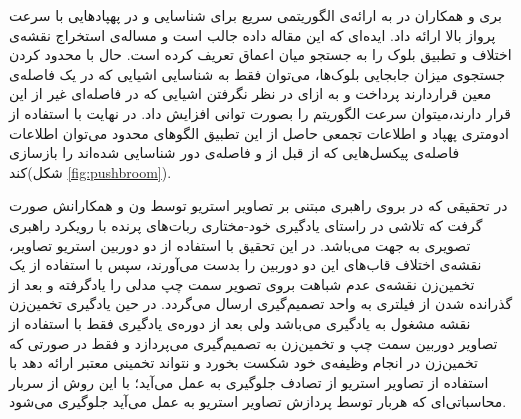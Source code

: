 بری و همکاران در  به ارائه‌ی الگوریتمی سریع برای شناسایی و  در پهپادهایی با سرعت پرواز بالا ارائه داد. ایده‌ای که این مقاله داده جالب است و مساله‌ی استخراج نقشه‌ی اختلاف و تطبیق بلوک را به جستجو میان اعماق تعریف کرده است. حال با محدود کردن جستجوی میزان جابجایی بلوک‌ها، می‌توان فقط به شناسایی اشیایی که در یک فاصله‌ی معین قراردارند پرداخت و به ازای در نظر نگرفتن اشیایی که در فاصله‌ای غیر از این قرار دارند،میتوان سرعت الگوریتم را بصورت توانی افزایش داد. در نهایت با استفاده از ادومتری پهپاد و اطلاعات تجمعی حاصل از این تطبیق الگوهای محدود می‌توان اطلاعات فاصله‌ی پیکسل‌هایی که از قبل از و فاصله‌ی دور شناسایی شده‌اند را بازسازی کند(شکل \ref{fig:pushbroom}).


در تحقیقی که در  بروی راهبری مبتنی بر تصاویر استریو توسط ون و همکارانش صورت گرفت که تلاشی در راستای یادگیری خود-مختاری ربات‌های پرنده با رویکرد راهبری تصویری به جهت  می‌باشد. در این تحقیق با استفاده از دو دوربین استریو تصاویر، نقشه‌ی اختلاف قاب‌های این دو دوربین را بدست می‌آورند، سپس با استفاده از یک تخمین‌زن نقشه‌ی عدم شباهت بروی تصویر سمت چپ مدلی را یادگرفته و بعد از گذرانده شدن از فیلتری به واحد تصمیم‌گیری ارسال می‌گردد. در حین یادگیری تخمین‌‌زن نقشه مشغول به یادگیری می‌باشد ولی بعد از دوره‌ی یادگیری فقط با استفاده از تصاویر دوربین سمت چپ و تخمین‌زن به تصمیم‌گیری می‌پردازد و فقط در صورتی که تخمین‌زن در انجام وظیفه‌ی خود شکست بخورد و نتواند تخمینی معتبر ارائه دهد با استفاده از تصاویر استریو از تصادف جلوگیری به عمل می‌آید؛ با این روش از سربار محاسباتی‌ای که هربار توسط پردازش تصاویر استریو به عمل می‌آید جلوگیری می‌شود.